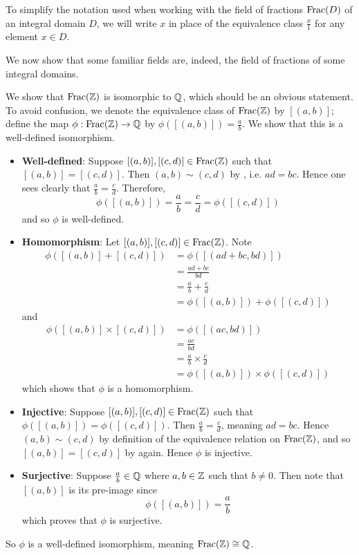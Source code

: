 To simplify the notation used when working with the field of fractions $\mathrm{Frac}(D)$ of an integral domain $D$, we will write $x$ in place of the equivalence class $\frac x1$ for any element $x \in D$.

We now show that some familiar fields are, indeed, the field of fractions of some integral domains.

\begin{example}
    We show that $\mathrm{Frac}(\mathbb{Z})$ is isomorphic to $\mathbb{Q}$, which should be an obvious statement. To avoid confusion, we denote the equivalence class of $\mathrm{Frac}(\mathbb{Z})$ by $[(a,b)]$; define the map $\phi: \mathrm{Frac}(\mathbb{Z}) \to \mathbb{Q}$ by $\phi([(a, b)]) = \frac ab$. We show that this is a well-defined isomorphism.
    \begin{itemize}
        \item \textbf{Well-defined}: Suppose $[(a, b)], [(c, d)] \in \mathrm{Frac}(\mathbb{Z})$ such that $[(a,b)]=[(c,d)]$. Then $(a, b) \mathrel{\sim} (c, d)$ by , i.e. $ad = bc$. Hence one sees clearly that $\frac ab = \frac cd$. Therefore,
        \[
            \phi([(a,b)]) = \frac ab = \frac cd = \phi([(c, d)])
        \]
        and so $\phi$ is well-defined.
        
        \item \textbf{Homomorphism}: Let $[(a, b)], [(c, d)] \in \mathrm{Frac}(\mathbb{Z})$. Note
        \begin{align*}
            \phi([(a,b)] + [(c,d)]) &= \phi([(ad+bc, bd)])\\
            &= \frac{ad+bc}{bd}\\
            &= \frac ab + \frac cd\\
            &= \phi([(a,b)]) + \phi([(c,d)])
        \end{align*}
        and
        \begin{align*}
            \phi([(a,b)] \times [(c,d)]) &= \phi([(ac, bd)])\\
            &= \frac{ac}{bd}\\
            &= \frac ab \times \frac cd\\
            &= \phi([(a,b)]) \times \phi([(c,d)])
        \end{align*}
        which shows that $\phi$ is a homomorphism.
        
        \item \textbf{Injective}: Suppose $[(a, b)], [(c, d)] \in \mathrm{Frac}(\mathbb{Z})$ such that $\phi([(a, b)]) = \phi([(c, d)])$. Then $\frac ab = \frac cd$, meaning $ad = bc$. Hence $(a, b) \mathrel{\sim} (c, d)$ by definition of the equivalence relation on $\mathrm{Frac}(\mathbb{Z})$, and so $[(a, b)] = [(c, d)]$ by  again. Hence $\phi$ is injective.
        
        \item \textbf{Surjective}: Suppose $\frac ab \in \mathbb{Q}$ where $a, b \in \mathbb{Z}$ such that $b \neq 0$. Then note that $[(a, b)]$ is its pre-image since
        \[
            \phi([(a, b)]) = \frac ab
        \]
        which proves that $\phi$ is surjective.
    \end{itemize}
    So $\phi$ is a well-defined isomorphism, meaning $\mathrm{Frac}(\mathbb{Z}) \cong \mathbb{Q}$.
\end{example}

